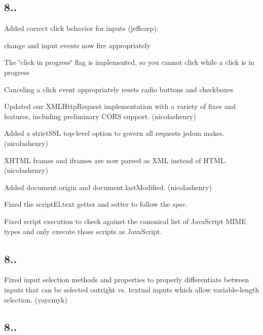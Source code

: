 \subsection*{8..}


\begin{DoxyItemize}
\item Added correct click behavior for inputs (jeffcarp)\+:
\begin{DoxyItemize}
\item {\ttfamily change} and {\ttfamily input} events now fire appropriately
\item The \char`\"{}click in progress\char`\"{} flag is implemented, so you cannot click while a click is in progress
\item Canceling a click event appropriately resets radio buttons and checkboxes
\end{DoxyItemize}
\item Updated our X\+M\+L\+Http\+Request implementation with a variety of fixes and features, including preliminary C\+O\+RS support. (nicolashenry)
\item Added a {\ttfamily strict\+S\+SL} top-\/level option to govern all requests jsdom makes. (nicolashenry)
\item X\+H\+T\+ML frames and iframes are now parsed as X\+ML instead of H\+T\+ML. (nicolashenry)
\item Added {\ttfamily document.\+origin} and {\ttfamily document.\+last\+Modified}. (nicolashenry)
\item Fixed the {\ttfamily script\+El.\+text} getter and setter to follow the spec.
\item Fixed script execution to check against the canonical list of Java\+Script M\+I\+ME types and only execute those scripts as Java\+Script.
\end{DoxyItemize}

\subsection*{8..}


\begin{DoxyItemize}
\item Fixed input selection methods and properties to properly differentiate between inputs that can be selected outright vs. textual inputs which allow variable-\/length selection. (yaycmyk)
\end{DoxyItemize}

\subsection*{8..}


